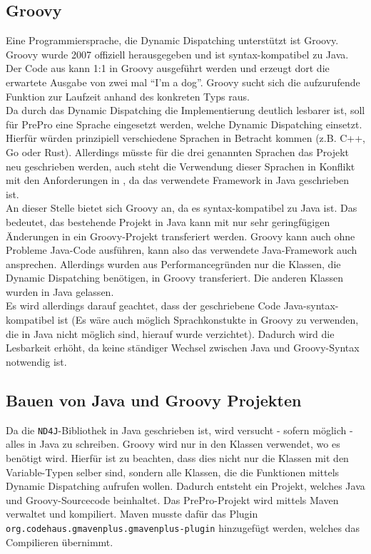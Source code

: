 \subsection{Groovy}
Eine Programmiersprache, die Dynamic Dispatching unterstützt ist Groovy.
Groovy wurde 2007 offiziell herausgegeben und ist syntax-kompatibel zu Java.
Der Code aus  kann 1:1 in Groovy ausgeführt werden und erzeugt dort die erwartete Ausgabe von zwei mal ``I'm a dog''.
Groovy sucht sich die aufzurufende Funktion zur Laufzeit anhand des konkreten Typs raus.\\
Da durch das Dynamic Dispatching die Implementierung deutlich lesbarer ist, soll für PrePro eine Sprache eingesetzt werden, welche Dynamic Dispatching einsetzt.
Hierfür würden prinzipiell verschiedene Sprachen in Betracht kommen (z.B. C++, Go oder Rust).
Allerdings müsste für die drei genannten Sprachen das Projekt neu geschrieben werden, auch steht die Verwendung dieser Sprachen in Konflikt mit den Anforderungen in , da das verwendete Framework in Java geschrieben ist.\\
An dieser Stelle bietet sich Groovy an, da es syntax-kompatibel zu Java ist.
Das bedeutet, das bestehende Projekt in Java kann mit nur sehr geringfügigen Änderungen in ein Groovy-Projekt transferiert werden.
Groovy kann auch ohne Probleme Java-Code ausführen, kann also das verwendete Java-Framework auch ansprechen.
Allerdings wurden aus Performancegründen nur die Klassen, die Dynamic Dispatching benötigen, in Groovy transferiert.
Die anderen Klassen wurden in Java gelassen.\\
Es wird allerdings darauf geachtet, dass der geschriebene Code Java-syntax-kompatibel ist (Es wäre auch möglich Sprachkonstukte in Groovy zu verwenden, die in Java nicht möglich sind, hierauf wurde verzichtet).
Dadurch wird die Lesbarkeit erhöht, da keine ständiger Wechsel zwischen Java und Groovy-Syntax notwendig ist.\\

\subsection{Bauen von Java und Groovy Projekten}
Da die \texttt{ND4J}-Bibliothek in Java geschrieben ist, wird versucht - sofern möglich - alles in Java zu schreiben.
Groovy wird nur in den Klassen verwendet, wo es benötigt wird.
Hierfür ist zu beachten, dass dies nicht nur die Klassen mit den Variable-Typen selber sind, sondern alle Klassen, die die Funktionen mittels Dynamic Dispatching aufrufen wollen.
Dadurch entsteht ein Projekt, welches Java und Groovy-Sourcecode beinhaltet.
Das PrePro-Projekt wird mittels Maven verwaltet und kompiliert.
Maven musste dafür das Plugin \texttt{org.codehaus.gmavenplus.gmavenplus-plugin} hinzugefügt werden, welches das Compilieren übernimmt.


